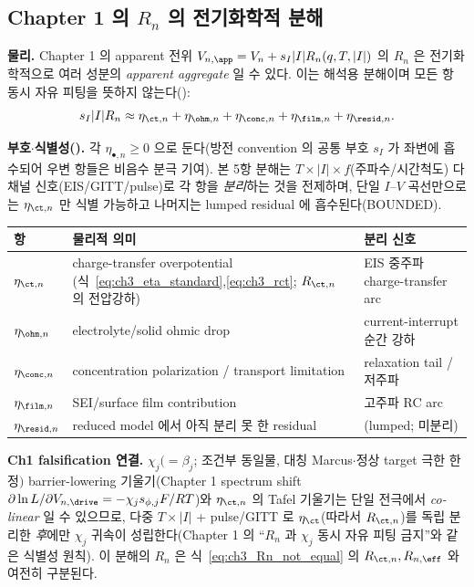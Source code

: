 \subsection{Chapter 1 의 $R_n$ 의 전기화학적 분해}\label{sec:ch3_Rn}
\textbf{물리.} Chapter 1 의 apparent 전위 $V_{n,\app}=V_n+s_I|I|R_n(q,T,|I|)$ 의 $R_n$ 은 전기화학적으로 여러
성분의 \emph{apparent aggregate} 일 수 있다. 이는 해석용 분해이며 모든 항 동시 자유 피팅을 뜻하지 않는다():
\begin{equation}
s_I|I|R_n\approx\eta_{\ct,n}+\eta_{\ohm,n}+\eta_{\conc,n}+\eta_{\film,n}+\eta_{\resid,n}.
\label{eq:ch3_Rn_decomp}
\end{equation}
\begin{boundbox}
\textbf{부호$\cdot$식별성().} 각 $\eta_{\bullet,n}\ge0$ 으로 둔다(방전 convention 의 공통 부호 $s_I$ 가
좌변에 흡수되어 우변 항들은 비음수 분극 기여). 본 5항 분해는 $T\times|I|\times f$(주파수/시간척도) 다채널
신호(EIS/GITT/pulse)로 각 항을 \emph{분리}하는 것을 전제하며, 단일 $I$--$V$ 곡선만으로는 $\eta_{\ct,n}$ 만
식별 가능하고 나머지는 lumped residual 에 흡수된다(BOUNDED).
\end{boundbox}
\begin{longtable}{p{} >{\raggedright\arraybackslash}p{} >{\raggedright\arraybackslash}p{}}
\toprule 항 & 물리적 의미 & 분리 신호 \\ \midrule \endhead
$\eta_{\ct,n}$ & charge-transfer overpotential (식~\eqref{eq:ch3_eta_standard},\allowbreak\eqref{eq:ch3_rct}; $R_{\ct,n}$ 의 전압강하) & EIS 중주파 charge-transfer arc \\
$\eta_{\ohm,n}$ & electrolyte/solid ohmic drop & current-interrupt 순간 강하 \\
$\eta_{\conc,n}$ & concentration polarization / transport limitation & relaxation tail / 저주파 \\
$\eta_{\film,n}$ & SEI/surface film contribution & 고주파 RC arc \\
$\eta_{\resid,n}$ & reduced model 에서 아직 분리 못 한 residual & (lumped; 미분리) \\
\bottomrule
\end{longtable}
\textbf{Ch1 falsification 연결.} $\chi_j(=\beta_j$; 조건부 동일물, 대칭 Marcus$\cdot$정상 target 극한 한정$)$ barrier-lowering 기울기(Chapter 1 spectrum shift
$\partial\ln L/\partial V_{n,\drive}=-\chi_j s_{\phi,j}F/RT$)와 $\eta_{\ct,n}$ 의 Tafel 기울기는 단일 전극에서
\emph{co-linear} 일 수 있으므로, 다중 $T\times|I|$ + pulse/GITT 로 $\eta_{\ct}$(따라서 $R_{\ct,n}$)를 독립
분리한 \emph{후}에만 $\chi_j$ 귀속이 성립한다(Chapter 1 의 ``$R_n$ 과 $\chi_j$ 동시 자유 피팅 금지''와 같은
식별성 원칙). 이 분해의 $R_n$ 은 식~\eqref{eq:ch3_Rn_not_equal} 의 $R_{\ct,n},R_{n,\eff}$ 와 여전히 구분된다.

